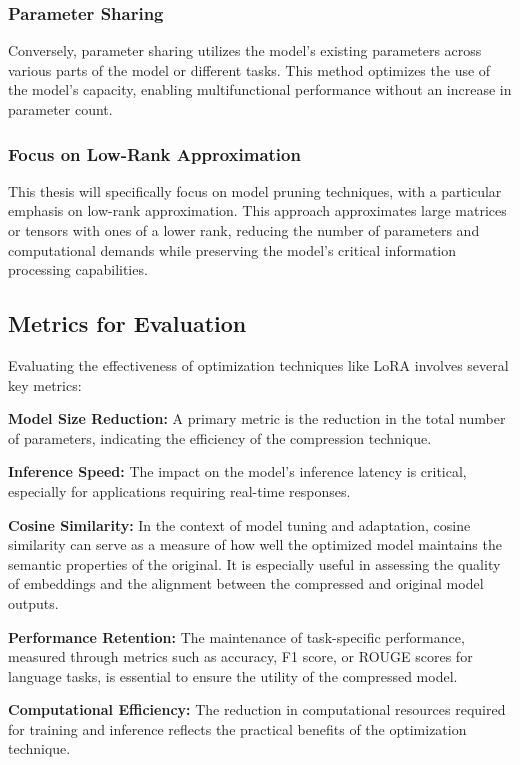         \subsubsection{Parameter Sharing}
        Conversely, parameter sharing utilizes the model's existing parameters across various parts of the model or different tasks. This method optimizes the use of the model’s capacity, enabling multifunctional performance without an increase in parameter count.

        \subsubsection{Focus on Low-Rank Approximation}
        This thesis will specifically focus on model pruning techniques, with a particular emphasis on low-rank approximation. This approach approximates large matrices or tensors with ones of a lower rank, reducing the number of parameters and computational demands while preserving the model's critical information processing capabilities.

    \subsection{Metrics for Evaluation}
        Evaluating the effectiveness of optimization techniques like LoRA involves several key metrics:
        
        \textbf{Model Size Reduction:} A primary metric is the reduction in the total number of parameters, indicating the efficiency of the compression technique.
        
        \textbf{Inference Speed:} The impact on the model's inference latency is critical, especially for applications requiring real-time responses.

        \textbf{Cosine Similarity:} In the context of model tuning and adaptation, cosine similarity can serve as a measure of how well the optimized model maintains the semantic properties of the original. It is especially useful in assessing the quality of embeddings and the alignment between the compressed and original model outputs.
        
        \textbf{Performance Retention:} The maintenance of task-specific performance, measured through metrics such as accuracy, F1 score, or ROUGE scores for language tasks, is essential to ensure the utility of the compressed model.
        
        \textbf{Computational Efficiency:} The reduction in computational resources required for training and inference reflects the practical benefits of the optimization technique.

